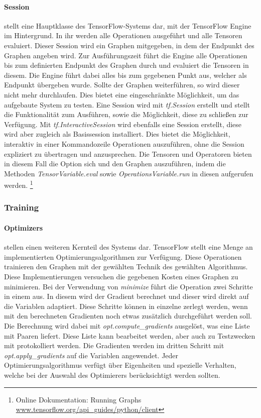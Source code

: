 \paragraph{Session} stellt eine Hauptklasse des TensorFlow-Systems dar, mit der TensorFlow Engine im Hintergrund.
In ihr werden alle Operationen ausgeführt und alle Tensoren evaluiert. 
Dieser Session wird ein Graphen mitgegeben, in dem der Endpunkt des Graphen angeben wird. 
Zur Ausführungszeit führt die Engine alle Operationen bis zum definierten Endpunkt des Graphen durch und evaluiert die Tensoren in diesem. 
Die Engine führt dabei alles bis zum gegebenen Punkt aus, welcher als Endpunkt übergeben wurde. 
Sollte der Graphen weiterführen, so wird dieser nicht mehr durchlaufen. 
Dies bietet eine eingeschränkte Möglichkeit, um das aufgebaute System zu testen. 
Eine Session wird mit \textit{tf.Session} erstellt und stellt die Funktionalität zum Ausführen, sowie die Möglichkeit, diese zu schließen zur Verfügung. 
Mit \textit{tf.InteractiveSession} wird ebenfalls eine Session erstellt, diese wird aber zugleich als Basissession installiert. 
Dies bietet die Möglichkeit, interaktiv in einer Kommandozeile Operationen auszuführen, ohne die Session expliziert zu übertragen und anzusprechen. 
Die Tensoren und Operatoren bieten in diesem Fall die Option sich und den Graphen auszuführen, indem die Methoden \textit{TensorVariable.eval} sowie \textit{OperationsVariable.run} in diesen aufgerufen werden. 
\footnote{Online Dokumentation: Running Graphs \url{www.tensorflow.org/api_guides/python/client}}

\subsubsection{Training}
\label{training}

\paragraph{Optimizers} stellen einen weiteren Kernteil des Systems dar. 
TensorFlow stellt eine Menge an implementierten Optimierungsalgorithmen zur Verfügung. 
Diese Operationen trainieren den Graphen mit der gewählten Technik des gewählten Algorithmus. 
Diese Implementierungen versuchen die gegebenen Kosten eines Graphen zu minimieren. 
Bei der Verwendung von \textit{minimize} führt die Operation zwei Schritte in einem aus. 
In diesem wird der Gradient berechnet und dieser wird direkt auf die Variablen adaptiert. 
Diese Schritte können in einzelne zerlegt werden, wenn mit den berechneten Gradienten noch etwas zusätzlich durchgeführt werden soll. 
Die Berechnung wird dabei mit \textit{opt.compute\_gradients} ausgelöst, was eine Liste mit Paaren liefert. 
Diese Liste kann bearbeitet werden, aber auch zu Testzwecken mit protokolliert werden. 
Die Gradienten werden im dritten Schritt mit \textit{opt.apply\_gradients} auf die Variablen angewendet. 
Jeder Optimierungsalgorithmus verfügt über Eigenheiten und spezielle Verhalten, welche bei der Auswahl des Optimierers berücksichtigt werden sollten.

